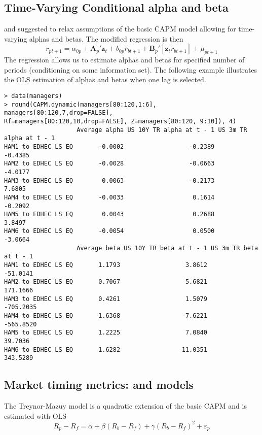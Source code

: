 \documentclass[11pt,a4paper]{article}
\begin{document}
\subsection{Time-Varying Conditional alpha and beta}
\cite{ferson1996measuring} and \cite{christopherson1999performance} suggested to relax assumptions of the basic CAPM model allowing for time-varying alphas and betas. The modified regression is then
\[
  r_{pt+1}=\alpha_{0p}+\mathbf{A}_{p}'\mathbf{z}_{t}+b_{0p}r_{bt+1}+\mathbf{B}_{p}'[\mathbf{z}_{t}r_{bt+1}]+\mu_{pt+1}
\]
The regression allows us to estimate alphas and betas for specified number of periods (conditioning on some information set). The following example illustrates the OLS estimation of alphas and betas when one lag is selected.
\begingroup
\fontsize{9pt}{12pt}\selectfont
\begin{verbatim}
> data(managers)
> round(CAPM.dynamic(managers[80:120,1:6], managers[80:120,7,drop=FALSE],
Rf=managers[80:120,10,drop=FALSE], Z=managers[80:120, 9:10]), 4)
                    Average alpha US 10Y TR alpha at t - 1 US 3m TR alpha at t - 1
HAM1 to EDHEC LS EQ       -0.0002                  -0.2389                 -0.4385
HAM2 to EDHEC LS EQ       -0.0028                  -0.0663                 -4.0177
HAM3 to EDHEC LS EQ        0.0063                  -0.2173                  7.6805
HAM4 to EDHEC LS EQ       -0.0033                   0.1614                 -0.2092
HAM5 to EDHEC LS EQ        0.0043                   0.2688                  3.8497
HAM6 to EDHEC LS EQ       -0.0054                   0.0500                 -3.0664
                    Average beta US 10Y TR beta at t - 1 US 3m TR beta at t - 1
HAM1 to EDHEC LS EQ       1.1793                  3.8612               -51.0141
HAM2 to EDHEC LS EQ       0.7067                  5.6821               171.1666
HAM3 to EDHEC LS EQ       0.4261                  1.5079              -705.2035
HAM4 to EDHEC LS EQ       1.6368                 -7.6221              -565.8520
HAM5 to EDHEC LS EQ       1.2225                  7.0840                39.7036
HAM6 to EDHEC LS EQ       1.6282                -11.0351               343.5289

\end{verbatim}
\endgroup

\subsection{Market timing metrics: \cite{henriksson1981market} and \cite{treynor1966can} models}
The Treynor-Mazuy model is a quadratic extension of the basic CAPM and is estimated with OLS
\[
  R_{p}-R_{f}=\alpha+\beta (R_{b} - R_{f})+\gamma (R_{b}-R_{f})^2+\varepsilon_{p}
\]
\end{document}
